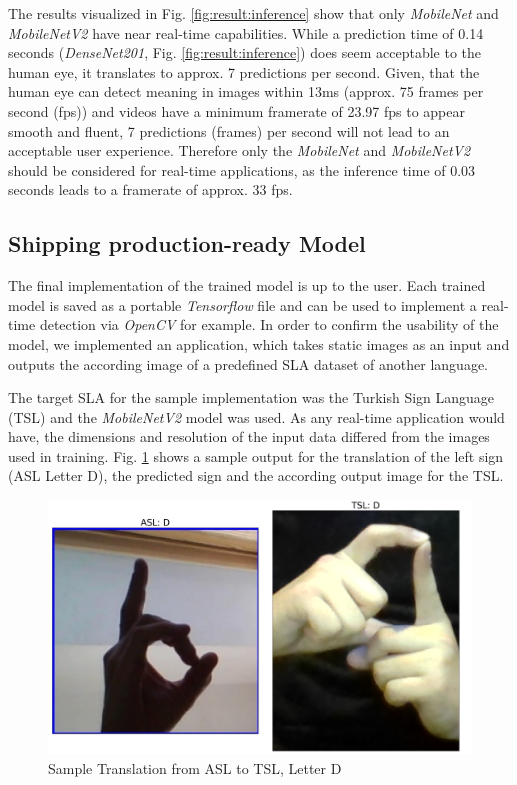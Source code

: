 The results visualized in Fig. \ref{fig:result:inference} show that only \textit{MobileNet} and \textit{MobileNetV2} have near real-time capabilities. While a prediction time of 0.14 seconds (\textit{DenseNet201}, Fig. \ref{fig:result:inference}) does seem acceptable to the human eye, it translates to approx. 7 predictions per second. Given, that the human eye can detect meaning in images within 13ms\cite{Potter2014} (approx. 75 frames per second (fps)) and videos have a minimum framerate of 23.97 fps to appear smooth and fluent, 7 predictions (frames) per second will not lead to an acceptable user experience. Therefore only the \textit{MobileNet} and \textit{MobileNetV2} should be considered for real-time applications, as the inference time of 0.03 seconds leads to a framerate of approx. 33 fps.

\subsection{Shipping production-ready Model}
The final implementation of the trained model is up to the user. Each trained model is saved as a portable \textit{Tensorflow} file and can be used to implement a real-time detection via \textit{OpenCV} for example. In order to confirm the usability of the model, we implemented an application, which takes static images as an input and outputs the according image of a predefined SLA dataset of another language. 

The target SLA for the sample implementation was the Turkish Sign Language (TSL) and the \textit{MobileNetV2} model was used. As any real-time application would have, the dimensions and resolution of the input data differed from the images used in training. Fig. \ref{fig:result:translation} shows a sample output for the translation of the left sign (ASL Letter D), the predicted sign and the according output image for the TSL.

\begin{figure}[h]
    \centering
    \caption{Sample Translation from ASL to TSL, Letter D}
	\label{fig:result:translation}
    \includegraphics[width=\linewidth]{figures/sample_translate_D_tur.png}
\end{figure}